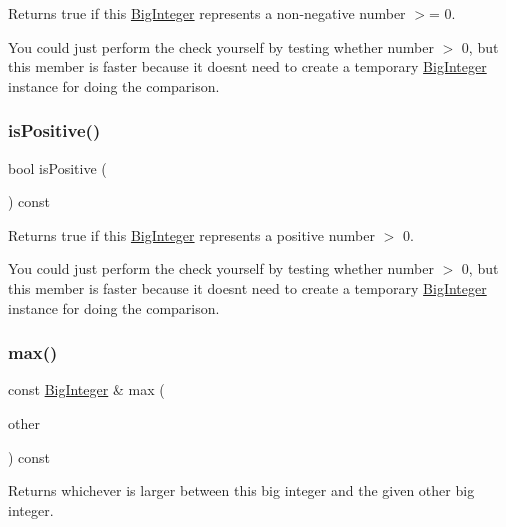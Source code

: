 Returns true if this \mbox{\hyperlink{classBigInteger}{Big\+Integer}} represents a non-\/negative number $>$= 0. 

You could just perform the check yourself by testing whether number $>$ 0, but this member is faster because it doesn\textquotesingle{}t need to create a temporary \mbox{\hyperlink{classBigInteger}{Big\+Integer}} instance for doing the comparison. \mbox{\label{classBigInteger_acaa49d84bd269a22c83b15966a483572}} 
\subsubsection{\texorpdfstring{is\+Positive()}{isPositive()}}
{\footnotesize\ttfamily bool is\+Positive (\begin{DoxyParamCaption}{ }\end{DoxyParamCaption}) const}



Returns true if this \mbox{\hyperlink{classBigInteger}{Big\+Integer}} represents a positive number $>$ 0. 

You could just perform the check yourself by testing whether number $>$ 0, but this member is faster because it doesn\textquotesingle{}t need to create a temporary \mbox{\hyperlink{classBigInteger}{Big\+Integer}} instance for doing the comparison. \mbox{\label{classBigInteger_a6d3e8559ebe8a6f0c8bebc756f4dd479}} 
\subsubsection{\texorpdfstring{max()}{max()}}
{\footnotesize\ttfamily const \mbox{\hyperlink{classBigInteger}{Big\+Integer}} \& max (\begin{DoxyParamCaption}\item[{const \mbox{\hyperlink{classBigInteger}{Big\+Integer}} \&}]{other }\end{DoxyParamCaption}) const}



Returns whichever is larger between this big integer and the given other big integer. 

\mbox{\label{classBigInteger_ae62de36198a0dcb836fd8680e7d71c64}} 
